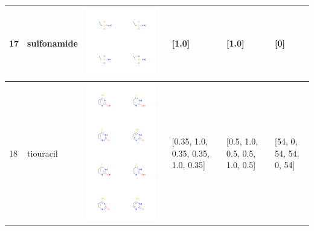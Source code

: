 \begin{longtable}{|l|l|l|l|l|l|l|}
\hline
17 & sulfonamide & \includegraphics[scale=0.6]{sulfonamideCA.png} & & [1.0]& [1.0] & [0] \\
\hline
18 & tiouracil & \includegraphics[scale=0.6]{tiouracilCA.png} & & [0.35, 1.0, 0.35, 0.35, 1.0, 0.35]& [0.5, 1.0, 0.5, 0.5, 1.0, 0.5] & [54, 0, 54, 54, 0, 54] \\

\end{longtable}
